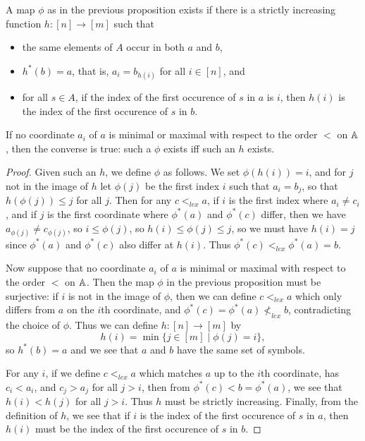 \documentclass[letterpaper,11pt]{article}
\begin{document}
\begin{prop} A map $\phi$ as in the previous proposition exists if there is a strictly increasing function $h : [n] \rightarrow [m]$ such that
\begin{itemize}
\item the same elements of $A$ occur in both $a$ and $b$,
\item $h^*(b) = a$, that is, $a_i = b_{h(i)}$ for all $i \in [n]$, and
\item for all $s \in A$, if the index of the first occurence of $s$ in $a$ is $i$, then $h(i)$ is the index of the first occurence of $s$ in $b$.
\end{itemize}
If no coordinate $a_i$ of $a$ is minimal or maximal with respect to the order $<$ on $\mathbb{A}$, then the converse is true: such a $\phi$ exists iff such an $h$ exists.
\end{prop}
\begin{proof} Given such an $h$, we define $\phi$ as follows. We set $\phi(h(i)) = i$, and for $j$ not in the image of $h$ let $\phi(j)$ be the first index $i$ such that $a_i = b_j$, so that $h(\phi(j)) \le j$ for all $j$. Then for any $c <_{lex} a$, if $i$ is the first index where $a_i \ne c_i$, and if $j$ is the first coordinate where $\phi^*(a)$ and $\phi^*(c)$ differ, then we have $a_{\phi(j)} \ne c_{\phi(j)}$, so $i \le \phi(j)$, so $h(i) \le \phi(j) \le j$, so we must have $h(i) = j$ since $\phi^*(a)$ and $\phi^*(c)$ also differ at $h(i)$. Thus $\phi^*(c) <_{lex} \phi^*(a) = b$.

Now suppose that no coordinate $a_i$ of $a$ is minimal or maximal with respect to the order $<$ on $\mathbb{A}$. Then the map $\phi$ in the previous proposition must be surjective: if $i$ is not in the image of $\phi$, then we can define $c <_{lex} a$ which only differs from $a$ on the $i$th coordinate, and $\phi^*(c) = \phi^*(a) \not<_{lex} b$, contradicting the choice of $\phi$. Thus we can define $h : [n] \rightarrow [m]$ by
\[
h(i) = \min\{j \in [m] \mid \phi(j) = i\},
\]
so $h^*(b) = a$ and we see that $a$ and $b$ have the same set of symbols.

For any $i$, if we define $c <_{lex} a$ which matches $a$ up to the $i$th coordinate, has $c_i < a_i$, and $c_j > a_j$ for all $j > i$, then from $\phi^*(c) < b = \phi^*(a)$, we see that $h(i) < h(j)$ for all $j > i$. Thus $h$ must be strictly increasing. Finally, from the definition of $h$, we see that if $i$ is the index of the first occurence of $s$ in $a$, then $h(i)$ must be the index of the first occurence of $s$ in $b$.
\end{proof}
\end{document}
